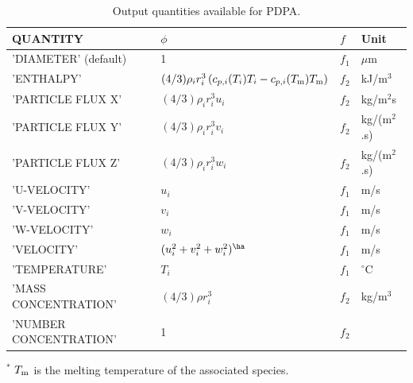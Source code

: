 \documentclass[11pt]{book}
\begin{document}
\begin{table}[!ht]
\caption[Output quantities available for PDPA]{Output quantities available for PDPA.}
\label{tbl:pdpa}
\begin{center}
\begin{tabular}{|l|l|l|l|}
\hline
{\ct QUANTITY}              & $\phi$                                                                            & $f$    & Unit \\ \hline
{\ct 'DIAMETER'} (default)  & 1                                                                                 & $f_1$  & $\mu$m \\
{\ct 'ENTHALPY'}            & $(4/3)\rho_i r_i^3 \left(c_{p,i}(T_i)T_i-c_{p,i}(T_{\rm m})T_{\rm m} \right)$     & $f_2$  & kJ/m$^3$ \\
{\ct 'PARTICLE FLUX X'}     & $(4/3)\rho_i r_i^3 u_i$                                                           & $f_2$  & kg/m$^2$s \\
{\ct 'PARTICLE FLUX Y'}     & $(4/3)\rho_i r_i^3 v_i$                                                           & $f_2$  & \si{kg/(m$^2$.s)} \\
{\ct 'PARTICLE FLUX Z'}     & $(4/3)\rho_i r_i^3 w_i$                                                           & $f_2$  & \si{kg/(m$^2$.s)} \\
{\ct 'U-VELOCITY'}          & $u_i$                                                                             & $f_1$  & m/s \\
{\ct 'V-VELOCITY'}          & $v_i$                                                                             & $f_1$  & m/s \\
{\ct 'W-VELOCITY'}          & $w_i$                                                                             & $f_1$  & m/s \\
{\ct 'VELOCITY'}            & $(u_i^2+v_i^2+w_i^2)^{\ha}$                                                       & $f_1$  & m/s \\
{\ct 'TEMPERATURE'}         & $T_i$                                                                             & $f_1$  & ${}^\circ$C \\
{\ct 'MASS CONCENTRATION'}  & $(4/3)\rho r_i^3 $                                                                & $f_2$  & kg/m$^3$ \\
{\ct 'NUMBER CONCENTRATION'}& 1                                                                                 & $f_2$  & \\
 \hline
\end{tabular}
\end{center}
${}^*$ $T_{\rm m}$ is the melting temperature of the associated species.
\end{table}
\end{document}
